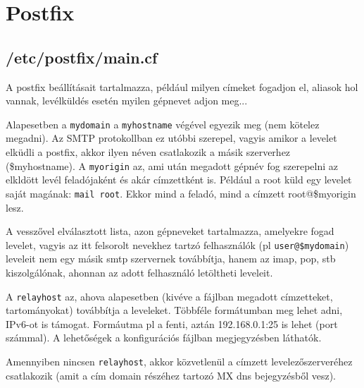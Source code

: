 \section{Postfix}

\subsection{/etc/postfix/main.cf}
A postfix beállításait tartalmazza, például milyen címeket fogadjon el, aliasok hol vannak, levélküldés esetén myilen
gépnevet adjon meg...



Alapesetben a \texttt{mydomain} a \texttt{myhostname} végével egyezik meg (nem kötelez megadni). Az SMTP protokollban
ez utóbbi szerepel, vagyis amikor a levelet elküdli a postfix, akkor ilyen néven csatlakozik a másik szerverhez
(\$myhostname). A \texttt{myorigin} az, ami után megadott gépnév fog szerepelni az elkldött levél feladójaként és akár
címzettként is. Például a root küld egy levelet saját magának: \texttt{mail root}. Ekkor mind a feladó, mind a címzett
root@\$myorigin lesz.

A  vesszővel elválasztott lista, azon gépneveket tartalmazza, amelyekre fogad levelet, vagyis az
itt felsorolt nevekhez tartzó felhasználók (pl \texttt{user@\$mydomain}) leveleit nem egy másik smtp szervernek
továbbítja, hanem az imap, pop, stb kiszolgálónak, ahonnan az adott felhasználó letöltheti leveleit.

A \texttt{relayhost} az, ahova alapesetben (kivéve a  fájlban megadott címzetteket,
tartományokat) továbbítja a leveleket. Többféle formátumban meg lehet adni, IPv6-ot is támogat. Formáutma pl a fenti,
aztán 192.168.0.1:25 is lehet (port számmal). A lehetőségek a konfigurációs fájlban megjegyzésben láthatók.

Amennyiben nincsen \texttt{relayhost}, akkor közvetlenül a címzett levelezőszerveréhez csatlakozik (amit a cím domain
részéhez tartozó MX dns bejegyzésből vesz).

